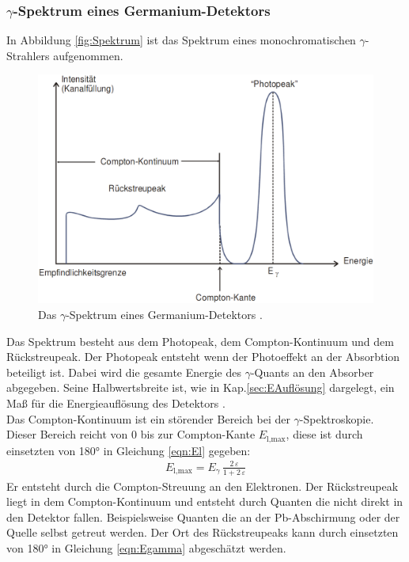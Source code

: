 \subsubsection{\texorpdfstring{$\gamma$}{}-Spektrum eines Germanium-Detektors}
In Abbildung \eqref{fig:Spektrum} ist das Spektrum eines monochromatischen $\gamma$-Strahlers aufgenommen.

\begin{figure} %
	\centering
	\includegraphics[width=0.8\linewidth]{Bilder/Spektrum.png}
	\caption{Das $\gamma$-Spektrum eines Germanium-Detektors \cite{V18}.}
	\label{fig:Spektrum}
\end{figure}

Das Spektrum besteht aus dem Photopeak, dem Compton-Kontinuum und dem Rückstreupeak. Der Photopeak entsteht wenn der Photoeffekt an der Absorbtion beteiligt ist. Dabei wird die gesamte Energie des $\gamma$-Quants an den Absorber abgegeben. Seine Halbwertsbreite ist, wie in Kap.\ref{sec:EAuflösung} dargelegt, ein Maß für die Energieauflösung des Detektors \cite[22]{V18}. \\
Das Compton-Kontinuum ist ein störender Bereich bei der $\gamma$-Spektroskopie. Dieser Bereich reicht von 0 bis zur Compton-Kante $E_\text{l,max}$, diese ist durch einsetzten von 180° in Gleichung \eqref{eqn:El} gegeben:
\begin{align}
	E_\text{l,max}= E_\gamma \, \frac{2\,\varepsilon} {1 + 2\,\varepsilon}
\end{align}
Er entsteht durch die Compton-Streuung an den Elektronen. Der Rückstreupeak liegt in dem Compton-Kontinuum und entsteht durch Quanten die nicht direkt in den Detektor fallen. Beispielsweise Quanten die an der Pb-Abschirmung oder der Quelle selbst getreut werden. Der Ort des Rückstreupeaks kann durch einsetzten von 180° in Gleichung \eqref{eqn:Egamma} abgeschätzt werden.



